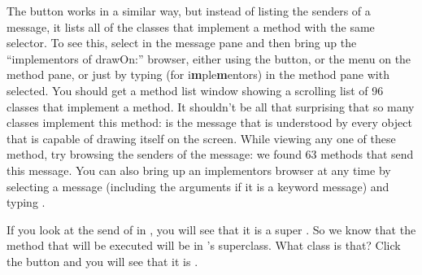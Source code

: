 \documentclass[a4paper,10pt,twoside]{book}
\begin{document}
The  button works in a similar way, but instead of listing the senders of a message, it lists all of the classes that implement a method with the same selector. To see this, select  in the message pane and then bring up the ``implementors of drawOn:'' browser, either using the  button, or the  menu on the method pane, or just by typing  (for {i\textbf{m}ple\textbf{m}entors}) in the method pane with  selected.  You should get a method list window showing a scrolling list of 96 classes that implement a  method.
It shouldn't be all that surprising that so many classes implement this method:  is the message that is understood by every object that is capable of drawing itself on the screen.  While viewing any one of these method, try browsing the senders of the  message:  we found 63 methods that send this message.  You can also bring up an implementors browser at any time by selecting a message (including the arguments if it is a keyword message) and typing .


If you look at the send of  in , you will see that it is a super .  So we know that the method that will be executed will be in 's superclass.  What class is that?  Click the  button and you will see that it is . 
\end{document}
